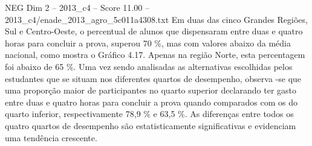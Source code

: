 \begin{textsample}{NEG Dim 2 – 2013\_c4 – Score 11.00 – 2013\_c4/enade\_2013\_agro\_5c011a4308.txt}
Em duas das cinco Grandes Regiões, Sul e Centro-Oeste, o percentual de alunos que dispensaram entre duas e quatro horas para concluir a prova, superou 70 \%, mas com valores abaixo da média nacional, como mostra o Gráfico 4.17.
Apenas na região Norte, esta percentagem foi abaixo de 65 \%.
Uma vez sendo analisadas as alternativas escolhidas pelos estudantes que se situam nos diferentes quartos de desempenho, observa -se que uma proporção maior de participantes no quarto superior declarando ter gasto entre duas e quatro horas para concluir a prova quando comparados com os do quarto inferior, respectivamente 78,9 \% e 63,5 \%.
As diferenças entre todos os quatro quartos de desempenho são estatisticamente significativas e evidenciam uma tendência crescente.

\end{textsample}
